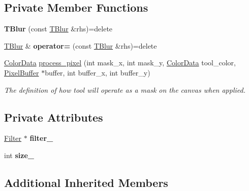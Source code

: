 \subsection*{Private Member Functions}
\begin{DoxyCompactItemize}
\item 
{\bfseries T\+Blur} (const \hyperlink{classimage__tools_1_1TBlur}{T\+Blur} \&rhs)=delete\hypertarget{classimage__tools_1_1TBlur_a5f9e4791a94be35cc27f3e242ce8b5db}{}\label{classimage__tools_1_1TBlur_a5f9e4791a94be35cc27f3e242ce8b5db}

\item 
\hyperlink{classimage__tools_1_1TBlur}{T\+Blur} \& {\bfseries operator=} (const \hyperlink{classimage__tools_1_1TBlur}{T\+Blur} \&rhs)=delete\hypertarget{classimage__tools_1_1TBlur_a3a6baeb4da03df232efbed9b2e2c8a03}{}\label{classimage__tools_1_1TBlur_a3a6baeb4da03df232efbed9b2e2c8a03}

\item 
\hyperlink{classimage__tools_1_1ColorData}{Color\+Data} \hyperlink{classimage__tools_1_1TBlur_ab3e88d9759fccf2ceb1c70a7c76c8dbc}{process\+\_\+pixel} (int mask\+\_\+x, int mask\+\_\+y, \hyperlink{classimage__tools_1_1ColorData}{Color\+Data} tool\+\_\+color, \hyperlink{classimage__tools_1_1PixelBuffer}{Pixel\+Buffer} $\ast$buffer, int buffer\+\_\+x, int buffer\+\_\+y)
\begin{DoxyCompactList}\small\item\em The definition of how tool will operate as a mask on the canvas when applied. \end{DoxyCompactList}\end{DoxyCompactItemize}
\subsection*{Private Attributes}
\begin{DoxyCompactItemize}
\item 
\hyperlink{classimage__tools_1_1Filter}{Filter} $\ast$ {\bfseries filter\+\_\+}\hypertarget{classimage__tools_1_1TBlur_a9e7607741d991f4e89c310c2a58af4dd}{}\label{classimage__tools_1_1TBlur_a9e7607741d991f4e89c310c2a58af4dd}

\item 
int {\bfseries size\+\_\+}\hypertarget{classimage__tools_1_1TBlur_a3a4d19930708958fe48ad468e97cda21}{}\label{classimage__tools_1_1TBlur_a3a4d19930708958fe48ad468e97cda21}

\end{DoxyCompactItemize}
\subsection*{Additional Inherited Members}


